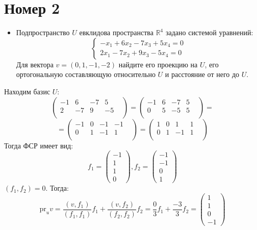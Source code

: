 \documentclass[a4paper,12pt]{article}
\begin{document}
\section*{Номер 2}
\begin{itemize}
\item
\begin{center}
Подпространство $U$ евклидова пространства $\mathbb{R}^4$ задано системой уравнений:
\[
\begin{cases}
-x_1 + 6x_2 - 7x_3 + 5x_4 = 0 \\
2x_1 - 7x_2 + 9x_3 - 5x_4 = 0
\end{cases}
\]
Для вектора $v = (0, 1, -1, -2)$ найдите его проекцию на $U$, его ортогональную составляющую относительно $U$ и расстояние от него до $U$.
\end{center}
\end{itemize}
Находим базис $U$:
\[
\begin{pmatrix}
-1 & 6 & -7 & 5 & \\
2 & -7 & 9 & -5 & \\
\end{pmatrix}
=
\begin{pmatrix}
-1 & 6 & -7 & 5 & \\
0 & 5 & -5 & 5 & \\
\end{pmatrix}
=
\]
\[
=
\begin{pmatrix}
-1 & 0 & -1 & -1 & \\
0 & 1 & -1 & 1 & \\
\end{pmatrix}
=
\begin{pmatrix}
1 & 0 & 1 & 1 & \\
0 & 1 & -1 & 1 & \\
\end{pmatrix}
\]
Тогда ФСР имеет вид:
\[
f_1 = 
\begin{pmatrix}
-1 \\ 1 \\ 1 \\ 0
\end{pmatrix}, 
f_2 =
\begin{pmatrix}
-1 \\ -1 \\ 0 \\ 1
\end{pmatrix}
\]
$(f_1, f_2) = 0$. Тогда:
\[
\text{pr}_u v = \frac{(v, f_1)}{(f_1, f_1)}f_1 + \frac{(v, f_2)}{(f_2, f_2)}f_2 = \frac{0}{3}f_1 + \frac{-3}{3}f_2 = \begin{pmatrix}
1 \\ 1 \\ 0 \\ -1
\end{pmatrix}
\]
\end{document}
